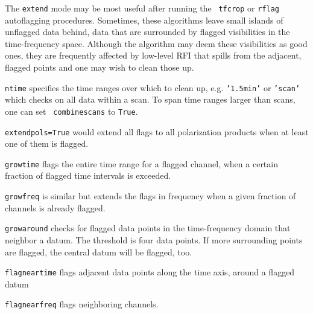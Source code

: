 The {\tt extend} mode may be most useful after running the {\tt
  tfcrop} or {\tt rflag} autoflagging procedures. Sometimes, these
algorithms leave small islands of unflagged data behind, data that are
surrounded by flagged visibilities in the time-frequency
space. Although the algorithm may deem these visibilities as good
ones, they are frequently affected by low-level RFI that spills from
the adjacent, flagged points and one may wish to clean those up.


{\tt ntime} specifies the time ranges over which to clean up,
e.g. {\tt '1.5min'} or {\tt 'scan'} which checks on all data within a
scan. To span time ranges larger than scans, one can set {\tt
  combinescans} to {\tt True}.

{\tt extendpols=True} would extend all flags to all polarization
products when at least one of them is flagged.

{\tt growtime} flags the entire time range for a flagged channel,
when a certain fraction of flagged time intervals is exceeded. 

{\tt growfreq} is similar but extends the flags in frequency when a given
fraction of channels is already flagged.

{\tt growaround} checks for flagged data points in the time-frequency
domain that neighbor a datum. The threshold is four data points. If
more surrounding points are flagged, the central datum will be
flagged, too.

{\tt flagneartime} flags adjacent data points along the time axis, around a flagged datum

{\tt  flagnearfreq} flags neighboring channels. 


